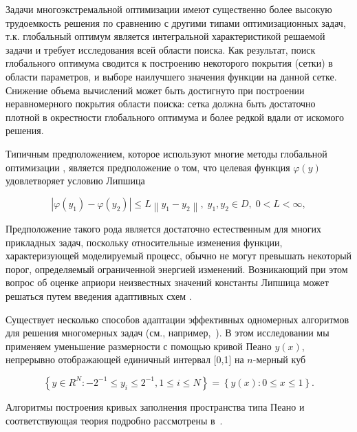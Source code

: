 \documentclass[mathematics,article,accept,pdftex,moreauthors]{Definitions/mdpi}
\begin{document}
Задачи многоэкстремальной оптимизации имеют существенно более высокую трудоемкость решения по сравнению с другими типами оптимизационных задач, т.к. глобальный оптимум является интегральной характеристикой решаемой задачи и требует исследования всей области поиска. Как результат, поиск глобального оптимума сводится к построению некоторого покрытия (сетки) в области параметров, и выборе наилучшего значения функции на данной сетке. Снижение объема вычислений может быть достигнуто при построении неравномерного покрытия области поиска: сетка должна быть достаточно плотной в окрестности глобального оптимума и более редкой вдали от искомого решения.

Типичным предположением, которое используют многие методы глобальной оптимизации \cite{Sergeyev2013,Evtushenko2013,Jones2009,Zilinskas2010}, является предположение о том, что целевая функция $\varphi(y)$ удовлетворяет условию Липшица
\begin{linenomath}
\begin{equation}
\left|\varphi(y_1)-\varphi(y_2)\right|\leq L\left\|y_1-y_2\right\|,\; y_1,y_2 \in D, \; 0<L<\infty,
\end{equation}
\end{linenomath}

Предположение такого рода является достаточно естественным для многих прикладных задач, поскольку относительные изменения функции, характеризующей моделируемый процесс, обычно не могут превышать некоторый порог, определяемый ограниченной энергией изменений. Возникающий при этом вопрос об оценке априори неизвестных значений константы Липшица может решаться путем введения адаптивных схем \cite{Strongin2020,Strongin2020_1}.

Существует несколько способов адаптации эффективных одномерных алгоритмов для решения многомерных задач (см., например,~\cite{Sergeyev2017,Zilinskas2014}). В этом исследовании мы применяем уменьшение размерности с помощью кривой Пеано $y(x)$, непрерывно отображающей единичный интервал [0,1] на $n$-мерный куб
\begin{linenomath}
\begin{equation}
\left\{y\in R^N: -2^{-1}\leq y_i \leq 2^{-1}, 1 \leq i \leq N\right\}=\left\{y(x):0\leq x \leq 1 \right\}.
\end{equation}
\end{linenomath}

Алгоритмы построения кривых заполнения пространства типа Пеано и соответствующая теория подробно рассмотрены в~\cite{Strongin2000,Sergeyev2013}.
\end{document}
